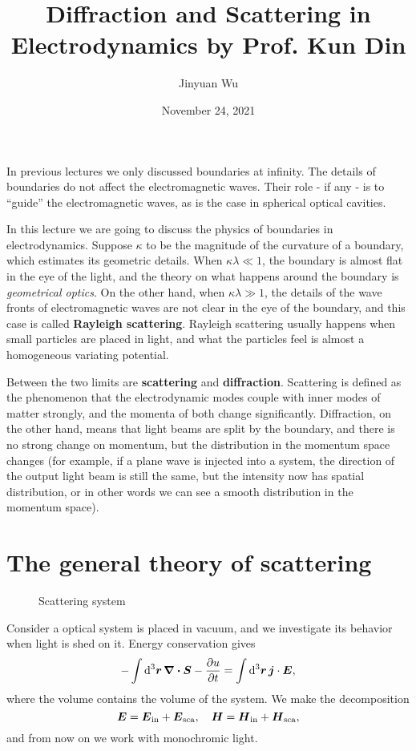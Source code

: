 \documentclass[hyperref, a4paper]{article}
\title{Diffraction and Scattering in Electrodynamics by Prof. Kun Din}
\author{Jinyuan Wu}
\date{November 24, 2021}
\newcommand*{\concept}[1]{{\textbf{#1}}}
\begin{document}
\maketitle

In previous lectures we only discussed boundaries at infinity. The details of boundaries do not affect the 
electromagnetic waves. Their role - if any - is to ``guide'' the electromagnetic waves, as is the case in 
spherical optical cavities. 

In this lecture we are going to discuss the physics of boundaries in electrodynamics.
Suppose $\kappa$ to be the magnitude of the curvature of a boundary, which estimates its geometric details.
When $\kappa \lambda \ll 1$, the boundary is almost flat in the eye of the light, and the theory on 
what happens around the boundary is \emph{geometrical optics}. 
On the other hand, when $\kappa \lambda \gg 1$, the details of the wave fronts of electromagnetic waves 
are not clear in the eye of the boundary, and this case is called \concept{Rayleigh scattering}.
Rayleigh scattering usually happens when small particles are placed in light, and what the particles 
feel is almost a homogeneous variating potential. 

Between the two limits are \concept{scattering} and \concept{diffraction}. Scattering is defined as the 
phenomenon that the electrodynamic modes couple with inner modes of matter strongly, and the momenta of 
both change significantly. Diffraction, on the other hand, means that light beams are split by the boundary, and
there is no strong change on momentum, but the distribution in the momentum space changes (for example, if a
plane wave is injected into a system, the direction of the output light beam is still the same, but the intensity
now has spatial distribution, or in other words we can see a smooth distribution in the momentum space).

\section{The general theory of scattering}

\begin{figure}
    \centering
    
    \caption{Scattering system}
    \label{fig:scattering}
\end{figure}

Consider a optical system is placed in vacuum, and we investigate its behavior when light is shed on it.
Energy conservation gives 
\begin{equation}
    - \int \dd[3]{\vb*{r}} \div{\vb*{S}} - \pdv{u}{t} = \int \dd[3]{\vb*{r}} \vb*{j} \cdot \vb*{E},
    \label{eq:energy-conservation-eq}
\end{equation}
where the volume contains the volume of the system.
We make the decomposition 
\begin{equation}
    \vb*{E} = \vb*{E}_\text{in} + \vb*{E}_\text{sca}, \quad \vb*{H} = \vb*{H}_\text{in} + \vb*{H}_\text{sca},
\end{equation}
and from now on we work with monochromic light. 
\end{document}
